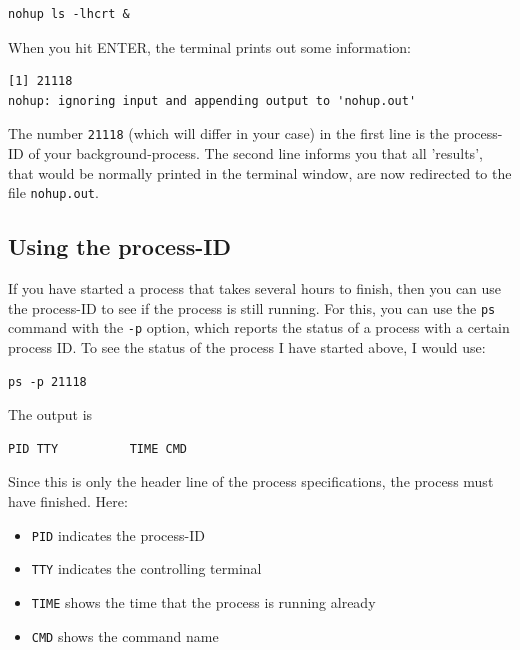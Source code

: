 \documentclass[11pt]{article}
\begin{document}
\begin{verbatim}
nohup ls -lhcrt &
\end{verbatim}

When you hit ENTER, the terminal prints out some information:

\begin{verbatim}
[1] 21118
nohup: ignoring input and appending output to 'nohup.out'
\end{verbatim}

The number \texttt{21118} (which will differ in your case) in the first line
is the process-ID of your background-process. The second line informs you that
all 'results', that would be normally printed in the terminal window,
are now redirected to the file \texttt{nohup.out}. 

\subsection{Using the process-ID}
\label{sec-5-1}
If you have started a process that takes several hours
to finish, then you can use the process-ID to see if the process is
still running. For this, you can use the \texttt{ps} command with the \texttt{-p}
option, which reports the status of a process with a certain process
ID. To see the status of the process I have started above, I would
use:

\begin{verbatim}
ps -p 21118
\end{verbatim}

The output is

\begin{verbatim}
PID TTY          TIME CMD
\end{verbatim}

Since this is only the header line of the process specifications, the
process must have finished. 
Here:
\begin{itemize}
\item \texttt{PID} indicates the process-ID
\item \texttt{TTY} indicates the controlling terminal
\item \texttt{TIME} shows the time that the process is running already
\item \texttt{CMD} shows the command name
\end{itemize}
\end{document}
